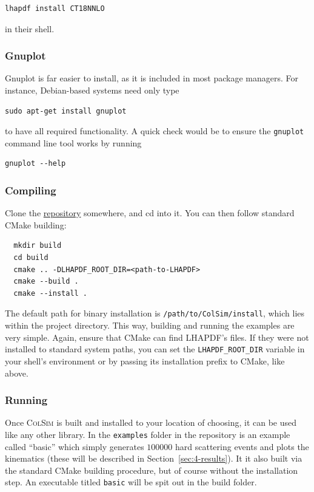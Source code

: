 \begin{verbatim}
lhapdf install CT18NNLO
\end{verbatim}

in their shell.

\subsubsection{Gnuplot}

Gnuplot is far easier to install, as it is included in most package managers. For instance, Debian-based systems need only type

\begin{verbatim}
sudo apt-get install gnuplot
\end{verbatim}

to have all required functionality. A quick check would be to ensure the \texttt{gnuplot} command line tool works by running

\begin{verbatim}
gnuplot --help
\end{verbatim}


\subsubsection{Compiling}

Clone the \href{https://github.com/champso1/ColSim}{repository} somewhere, and cd into it. You can then follow standard CMake building:

\begin{verbatim}
  mkdir build
  cd build
  cmake .. -DLHAPDF_ROOT_DIR=<path-to-LHAPDF>
  cmake --build .
  cmake --install .
\end{verbatim}

The default path for binary installation is \texttt{/path/to/ColSim/install}, which lies within the project directory. This way, building and running the examples are very simple. Again, ensure that CMake can find LHAPDF's files. If they were not installed to standard system paths, you can set the \texttt{LHAPDF\_ROOT\_DIR} variable in your shell's environment or by passing its installation prefix to CMake, like above.

\subsubsection{Running}

Once \textsc{ColSim} is built and installed to your location of choosing, it can be used like any other library. In the \texttt{examples} folder in the repository is an example called ``basic'' which simply generates $\num{100000}$ hard scattering events and plots the kinematics (these will be described in Section~\ref{sec:4-results}). It it also built via the standard CMake building procedure, but of course without the installation step. An executable titled \texttt{basic} will be spit out in the build folder.

